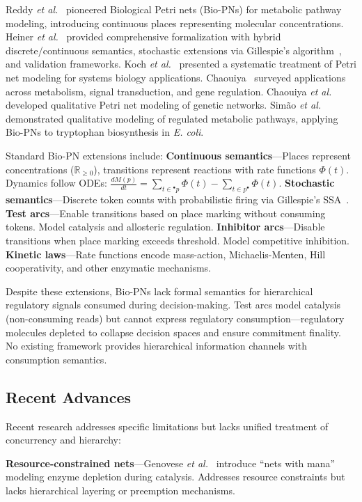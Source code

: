 \documentclass[twocolumn,11pt]{article}
\newcommand{\etal}{\textit{et al.}}  %
\begin{document}
Reddy \etal~\cite{reddy1993} pioneered Biological Petri nets (Bio-PNs) for metabolic pathway modeling, introducing continuous places representing molecular concentrations. Heiner \etal~\cite{heiner2008} provided comprehensive formalization with hybrid discrete/continuous semantics, stochastic extensions via Gillespie's algorithm~\cite{gillespie1977}, and validation frameworks. Koch \etal~\cite{koch2011} presented a systematic treatment of Petri net modeling for systems biology applications. Chaouiya~\cite{chaouiya2007} surveyed applications across metabolism, signal transduction, and gene regulation. Chaouiya \etal~\cite{chaouiya2006} developed qualitative Petri net modeling of genetic networks. Sim\~ao \etal~\cite{simao2005} demonstrated qualitative modeling of regulated metabolic pathways, applying Bio-PNs to tryptophan biosynthesis in \textit{E. coli}.

Standard Bio-PN extensions include: \textbf{Continuous semantics}---Places represent concentrations ($\mathbb{R}_{\geq 0}$), transitions represent reactions with rate functions $\Phi(t)$. Dynamics follow ODEs: $\frac{dM(p)}{dt} = \sum_{t \in {}^\bullet p} \Phi(t) - \sum_{t \in p^\bullet} \Phi(t)$. \textbf{Stochastic semantics}---Discrete token counts with probabilistic firing via Gillespie's SSA~\cite{gillespie1977}. \textbf{Test arcs}---Enable transitions based on place marking without consuming tokens. Model catalysis and allosteric regulation. \textbf{Inhibitor arcs}---Disable transitions when place marking exceeds threshold. Model competitive inhibition. \textbf{Kinetic laws}---Rate functions encode mass-action, Michaelis-Menten, Hill cooperativity, and other enzymatic mechanisms.

Despite these extensions, Bio-PNs lack formal semantics for hierarchical regulatory signals consumed during decision-making. Test arcs model catalysis (non-consuming reads) but cannot express regulatory consumption---regulatory molecules depleted to collapse decision spaces and ensure commitment finality. No existing framework provides hierarchical information channels with consumption semantics.

\subsection{Recent Advances}

Recent research addresses specific limitations but lacks unified treatment of concurrency and hierarchy:

\noindent\textbf{Resource-constrained nets}---Genovese \etal~\cite{genovese2021} introduce ``nets with mana'' modeling enzyme depletion during catalysis. Addresses resource constraints but lacks hierarchical layering or preemption mechanisms.
\end{document}
